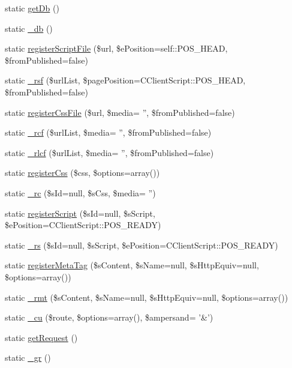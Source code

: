 \begin{DoxyCompactItemize}
static \hyperlink{classYiiXLBase_a994ac6292d92ce6c172ee2f655b91ae4}{getDb} ()
\item 
static \hyperlink{classYiiXLBase_a0debfa12a6b7b0b27d739a92f7d9ac58}{\_\-db} ()
\item 
static \hyperlink{classYiiXLBase_a6fd77833c97fcb3d12378783f60c2942}{registerScriptFile} (\$url, \$ePosition=self::POS\_\-HEAD, \$fromPublished=false)
\item 
static \hyperlink{classYiiXLBase_ae5089c4caea1197b2462a18eda83ca8c}{\_\-rsf} (\$urlList, \$pagePosition=CClientScript::POS\_\-HEAD, \$fromPublished=false)
\item 
static \hyperlink{classYiiXLBase_af06aa8413e78124ffe297435efed445a}{registerCssFile} (\$url, \$media= '', \$fromPublished=false)
\item 
static \hyperlink{classYiiXLBase_a617fe0ffa46c9fc20d8c3576a2c73cf8}{\_\-rcf} (\$urlList, \$media= '', \$fromPublished=false)
\item 
static \hyperlink{classYiiXLBase_ab608e015cc2117b42d41efd1c1d0c579}{\_\-rlcf} (\$urlList, \$media= '', \$fromPublished=false)
\item 
static \hyperlink{classYiiXLBase_a06e30551462355a35c656bf1e7ded6f9}{registerCss} (\$css, \$options=array())
\item 
static \hyperlink{classYiiXLBase_a631b30f9b1ef5e922e29ed4156e9bb53}{\_\-rc} (\$sId=null, \$sCss, \$media= '')
\item 
static \hyperlink{classYiiXLBase_a9fcce4225d8f12cbd7edcf81b27b8f42}{registerScript} (\$sId=null, \$sScript, \$ePosition=CClientScript::POS\_\-READY)
\item 
static \hyperlink{classYiiXLBase_a982d30aee3a52f73b0e935ef7c81b03b}{\_\-rs} (\$sId=null, \$sScript, \$ePosition=CClientScript::POS\_\-READY)
\item 
static \hyperlink{classYiiXLBase_ae9bfa6d4f88e076811968824126f9725}{registerMetaTag} (\$sContent, \$sName=null, \$sHttpEquiv=null, \$options=array())
\item 
static \hyperlink{classYiiXLBase_a7d3840f071b5cbf2e5b2fc57d0b5292a}{\_\-rmt} (\$sContent, \$sName=null, \$sHttpEquiv=null, \$options=array())
\item 
static \hyperlink{classYiiXLBase_a52be8b5ea3282bce6405f2e579e6db30}{\_\-cu} (\$route, \$options=array(), \$ampersand= '\&')
\item 
static \hyperlink{classYiiXLBase_a8bc323d82e5265f16d9cd356d0a02dba}{getRequest} ()
\item 
static \hyperlink{classYiiXLBase_ad94454df47e24b75197910a090e61ffa}{\_\-gr} ()

\end{DoxyCompactItemize}
